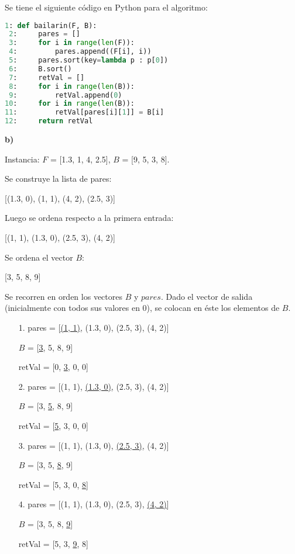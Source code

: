 \documentclass{article}
\begin{document}
Se tiene el siguiente código en Python para el algoritmo:

\begin{lstlisting}[language=Python]
 1: def bailarin(F, B):
 2:     pares = []
 3:     for i in range(len(F)):
 4:         pares.append((F[i], i))
 5:     pares.sort(key=lambda p : p[0])
 6:     B.sort()
 7:     retVal = []
 8:     for i in range(len(B)):
 9:         retVal.append(0)
10:     for i in range(len(B)):
11:         retVal[pares[i][1]] = B[i]
12:     return retVal
\end{lstlisting}

\textbf{b)}

Instancia: $F$ = [1.3, 1, 4, 2.5], $B$ = [9, 5, 3, 8].

Se construye la lista de pares:

[(1.3, 0), (1, 1), (4, 2), (2.5, 3)]

Luego se ordena respecto a la primera entrada:

[(1, 1), (1.3, 0), (2.5, 3), (4, 2)]

Se ordena el vector $B$:

[3, 5, 8, 9]

Se recorren en orden los vectores $B$ y $pares$. Dado el vector de salida (inicialmente con todos sus valores en 0), se colocan en éste los elementos de $B$.

\begin{itemize}
\item[1.] pares = [\underline{(1, 1)}, (1.3, 0), (2.5, 3), (4, 2)]

$B$ = [\underline{3}, 5, 8, 9]

retVal = [0, \underline{3}, 0, 0]

\item[2.] pares = [(1, 1), \underline{(1.3, 0)}, (2.5, 3), (4, 2)]

$B$ = [3, \underline{5}, 8, 9]

retVal = [\underline{5}, 3, 0, 0]

\item[3.] pares = [(1, 1), (1.3, 0), \underline{(2.5, 3)}, (4, 2)]

$B$ = [3, 5, \underline{8}, 9]

retVal = [5, 3, 0, \underline{8}]

\item[4.] pares = [(1, 1), (1.3, 0), (2.5, 3), \underline{(4, 2)}]

$B$ = [3, 5, 8, \underline{9}]

retVal = [5, 3, \underline{9}, 8]

\end{itemize}
\end{document}

